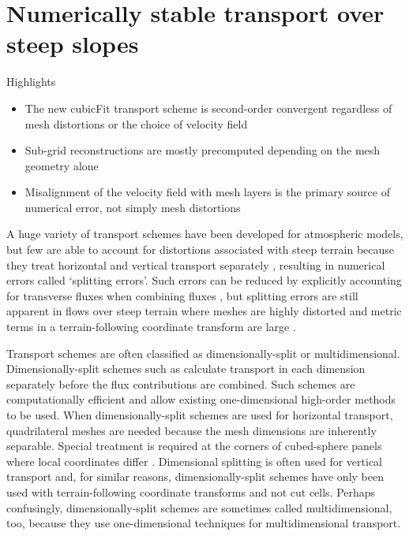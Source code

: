 \chapter{Numerically stable transport over steep slopes}
\label{ch:cubicFit}

\begin{highlights}
{\Large Highlights}
\begin{itemize}
	\item The new cubicFit transport scheme is second-order convergent regardless of mesh distortions or the choice of velocity field
	\item Sub-grid reconstructions are mostly precomputed depending on the mesh geometry alone
	\item Misalignment of the velocity field with mesh layers is the primary source of numerical error, not simply mesh distortions
\end{itemize}
\end{highlights}

A huge variety of transport schemes have been developed for atmospheric models, but few are able to account for distortions associated with steep terrain because they treat horizontal and vertical transport separately \citep{kent2014}, resulting in numerical errors called `splitting errors'.
Such errors can be reduced by explicitly accounting for transverse fluxes when combining fluxes \citep{leonard1996}, but splitting errors are still apparent in flows over steep terrain where meshes are highly distorted and metric terms in a terrain-following coordinate transform are large \citep{chen2017}.

Transport schemes are often classified as dimensionally-split or multidimensional.
Dimension\-ally-split schemes such as \citep{lin-rood1996,guo2014} calculate transport in each dimension separately before the flux contributions are combined.  Such schemes are computationally efficient and allow existing one-dimensional high-order methods to be used.
When dimensionally-split schemes are used for horizontal transport, quadrilateral meshes are needed because the mesh dimensions are inherently separable.  Special treatment is required at the corners of cubed-sphere panels where local coordinates differ \citep{putman-lin2007,guo2014}.
Dimensional splitting is often used for vertical transport and, for similar reasons, dimensionally-split schemes have only been used with terrain-following coordinate transforms and not cut cells.
Perhaps confusingly, dimensionally-split schemes are sometimes called multidimensional, too, because they use one-dimensional techniques for multidimensional transport.

